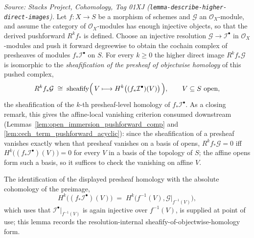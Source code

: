 \begin{lemma}
  \label{lem:higher_direct_image_presheaf}
  \textit{Source: Stacks Project, Cohomology, Tag 01XJ
  (\texttt{lemma-describe-higher-direct-images}).}
  Let \(f : X \to S\) be a morphism of schemes and \(\mathcal{G}\) an
  \(\mathcal{O}_X\)-module, and assume the category of \(\mathcal{O}_X\)-modules has
  enough injective objects, so that the derived pushforward \(R^k f_*\) is defined.
  Choose an injective resolution \(\mathcal{G} \to \mathcal{I}^\bullet\) in
  \(\mathcal{O}_X\)-modules and push it forward degreewise to obtain the cochain complex
  of presheaves of modules \(f_*\mathcal{I}^\bullet\) on \(S\). For every \(k \geq 0\)
  the higher direct image \(R^k f_*\mathcal{G}\) is isomorphic to the
  \emph{sheafification of the presheaf of objectwise homology} of this pushed complex,
  \[
    R^k f_*\mathcal{G}
      \;\cong\;
    \operatorname{sheafify}\Bigl(\,V \longmapsto
      H^k\bigl((f_*\mathcal{I}^\bullet)(V)\bigr)\,\Bigr),
    \qquad V \subseteq S \text{ open},
  \]
  the sheafification of the \(k\)-th presheaf-level homology of
  \(f_*\mathcal{I}^\bullet\). As a closing remark, this gives the affine-local
  vanishing criterion consumed downstream
  (Lemmas~\ref{lem:open_immersion_pushforward_comp} and
  \ref{lem:cech_term_pushforward_acyclic}): since the sheafification of a presheaf
  vanishes exactly when that presheaf vanishes on a basis of opens,
  \(R^k f_*\mathcal{G} = 0\) iff \(H^k\bigl((f_*\mathcal{I}^\bullet)(V)\bigr) = 0\)
  for every \(V\) in a basis of the topology of \(S\); the affine opens form such a
  basis, so it suffices to check the vanishing on affine \(V\).

  The identification of the displayed presheaf homology with the absolute cohomology
  of the preimage,
  \[
    H^k\bigl((f_*\mathcal{I}^\bullet)(V)\bigr)
      \;=\;
    H^k\bigl(f^{-1}(V), \mathcal{G}|_{f^{-1}(V)}\bigr),
  \]
  which uses that \(\mathcal{I}^\bullet|_{f^{-1}(V)}\) is again injective over
  \(f^{-1}(V)\), is supplied at point of use; this lemma records the
  resolution-internal sheafify-of-objectwise-homology form.
\end{lemma}

